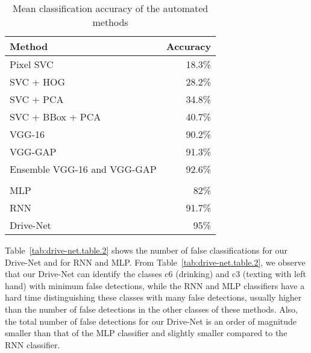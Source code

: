 \begin{table}[]
\centering
\caption{Mean classification accuracy of the automated methods}%
\label{tab:drive-net.table.1}
\begin{tabular}{@{}lr@{}}
\toprule
\textbf{Method}             & \textbf{Accuracy} \\ \midrule
Pixel SVC                   & 18.3\%            \\
SVC + HOG                   & 28.2\%            \\
SVC + PCA                   & 34.8\%            \\
SVC + BBox + PCA            & 40.7\%            \\
VGG-16                      & 90.2\%            \\
VGG-GAP                     & 91.3\%            \\
Ensemble VGG-16 and VGG-GAP & 92.6\%            \\
\multicolumn{2}{l}{\cellcolor[HTML]{C0C0C0}}    \\
MLP                         & 82\%              \\
RNN                         & 91.7\%            \\
Drive-Net                   & 95\%              \\ \bottomrule
\end{tabular}
\end{table}

Table~\ref{tab:drive-net.table.2} shows the number of false classifications for our Drive-Net and for RNN and MLP\@. From Table~\ref{tab:drive-net.table.2}, we observe that our Drive-Net can identify the classes c6 (drinking) and c3 (texting with left hand) with minimum false detections, while the RNN and MLP classifiers have a hard time distinguishing these classes with many false detections, usually higher than the number of false detections in the other classes of these methods. Also, the total number of false detections for our Drive-Net is an order of magnitude smaller than that of the MLP classifier and slightly smaller compared to the RNN classifier.

